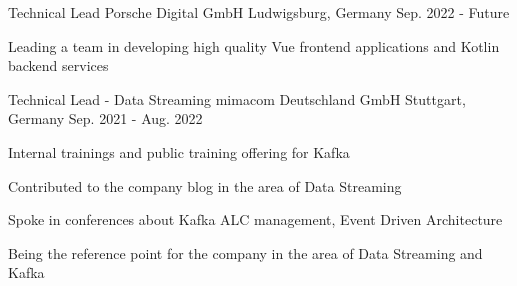 
\begin{cventries}

  \cventry
    {Technical Lead} %
    {Porsche Digital GmbH} %
    {Ludwigsburg, Germany} %
    {Sep. 2022 - Future} %
    {
      \begin{cvitems} %
        \item {Leading a team in developing high quality Vue frontend applications and Kotlin backend services}
      \end{cvitems}
    }

  \cventry
    {Technical Lead - Data Streaming} %
    {mimacom Deutschland GmbH} %
    {Stuttgart, Germany} %
    {Sep. 2021 - Aug. 2022} %
    {
      \begin{cvitems} %
        \item {Internal trainings and public training offering for Kafka}
        \item {Contributed to the company blog in the area of Data Streaming}
        \item {Spoke in conferences about Kafka ALC management, Event Driven Architecture}
        \item {Being the reference point for the company in the area of Data Streaming and Kafka}
      \end{cvitems}
    }


\end{cventries}
